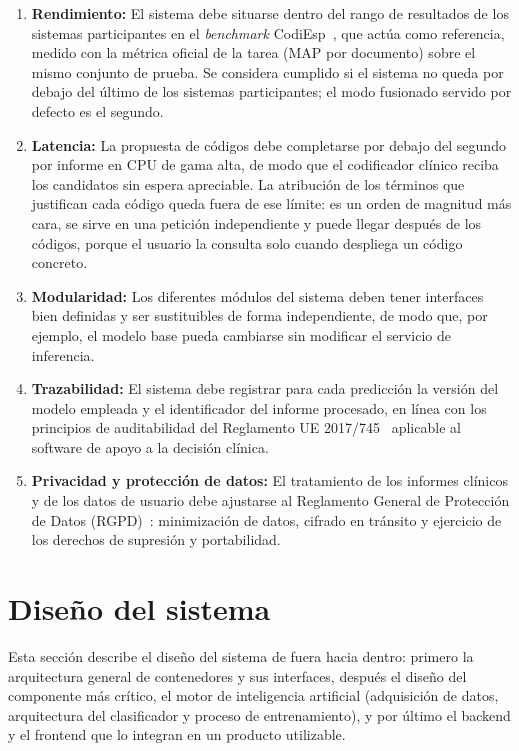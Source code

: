 \begin{enumerate}[label=\textbf{RNF\arabic*.}, leftmargin=*]
 \item \textbf{Rendimiento:} El sistema debe situarse dentro del rango de resultados de los sistemas participantes en el \emph{benchmark} CodiEsp~\cite{miranda2020}, que actúa como referencia, medido con la métrica oficial de la tarea (MAP por documento) sobre el mismo conjunto de prueba. Se considera cumplido si el sistema no queda por debajo del último de los sistemas participantes; el modo fusionado servido por defecto es el segundo.
 \item \textbf{Latencia:} La propuesta de códigos debe completarse por debajo del segundo por informe en CPU de gama alta, de modo que el codificador clínico reciba los candidatos sin espera apreciable. La atribución de los términos que justifican cada código queda fuera de ese límite: es un orden de magnitud más cara, se sirve en una petición independiente y puede llegar después de los códigos, porque el usuario la consulta solo cuando despliega un código concreto.
 \item \textbf{Modularidad:} Los diferentes módulos del sistema deben tener interfaces bien definidas y ser sustituibles de forma independiente, de modo que, por ejemplo, el modelo base pueda cambiarse sin modificar el servicio de inferencia.
 \item \textbf{Trazabilidad:} El sistema debe registrar para cada predicción la versión del modelo empleada y el identificador del informe procesado, en línea con los principios de auditabilidad del Reglamento UE 2017/745~\cite{eu2017745} aplicable al software de apoyo a la decisión clínica.
 \item \textbf{Privacidad y protección de datos:} El tratamiento de los informes clínicos y de los datos de usuario debe ajustarse al Reglamento General de Protección de Datos (RGPD)~\cite{RGPD16}: minimización de datos, cifrado en tránsito y ejercicio de los derechos de supresión y portabilidad.
\end{enumerate}

\section{Diseño del sistema}

Esta sección describe el diseño del sistema de fuera hacia dentro: primero la arquitectura general de contenedores y sus interfaces, después el diseño del componente más crítico, el motor de inteligencia artificial (adquisición de datos, arquitectura del clasificador y proceso de entrenamiento), y por último el backend y el frontend que lo integran en un producto utilizable.

